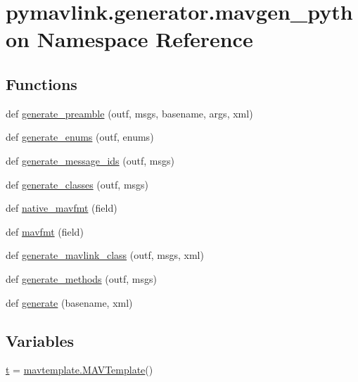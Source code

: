 \hypertarget{namespacepymavlink_1_1generator_1_1mavgen__python}{}\section{pymavlink.\+generator.\+mavgen\+\_\+python Namespace Reference}
\label{namespacepymavlink_1_1generator_1_1mavgen__python}
\subsection*{Functions}
\begin{DoxyCompactItemize}
\item 
def \mbox{\hyperlink{namespacepymavlink_1_1generator_1_1mavgen__python_a780f486d09315a450a465f7a80ab0041}{generate\+\_\+preamble}} (outf, msgs, basename, args, xml)
\item 
def \mbox{\hyperlink{namespacepymavlink_1_1generator_1_1mavgen__python_a253e804c65431414df3a94b98ec365be}{generate\+\_\+enums}} (outf, enums)
\item 
def \mbox{\hyperlink{namespacepymavlink_1_1generator_1_1mavgen__python_a9dc4c238a02ecd403ee24d44eaebb1ce}{generate\+\_\+message\+\_\+ids}} (outf, msgs)
\item 
def \mbox{\hyperlink{namespacepymavlink_1_1generator_1_1mavgen__python_ac6dff0a7f2badc0a44428acc00c9801f}{generate\+\_\+classes}} (outf, msgs)
\item 
def \mbox{\hyperlink{namespacepymavlink_1_1generator_1_1mavgen__python_aa80503aac0716bddd09ad1395f7dd2d5}{native\+\_\+mavfmt}} (field)
\item 
def \mbox{\hyperlink{namespacepymavlink_1_1generator_1_1mavgen__python_aacfccd1b0104347f78648e168eac482d}{mavfmt}} (field)
\item 
def \mbox{\hyperlink{namespacepymavlink_1_1generator_1_1mavgen__python_a7c6799bd201b339f9eb6f86d486c4be5}{generate\+\_\+mavlink\+\_\+class}} (outf, msgs, xml)
\item 
def \mbox{\hyperlink{namespacepymavlink_1_1generator_1_1mavgen__python_ab461b369bfa4a880e2211f4d574450e5}{generate\+\_\+methods}} (outf, msgs)
\item 
def \mbox{\hyperlink{namespacepymavlink_1_1generator_1_1mavgen__python_aca7b16b5ead8d9f4c5a03ed6996b4776}{generate}} (basename, xml)
\end{DoxyCompactItemize}
\subsection*{Variables}
\begin{DoxyCompactItemize}
\item 
\mbox{\hyperlink{namespacepymavlink_1_1generator_1_1mavgen__python_afbc8a434637253009d3198fbb4f64b77}{t}} = \mbox{\hyperlink{classpymavlink_1_1generator_1_1mavtemplate_1_1MAVTemplate}{mavtemplate.\+M\+A\+V\+Template}}()
\end{DoxyCompactItemize}



